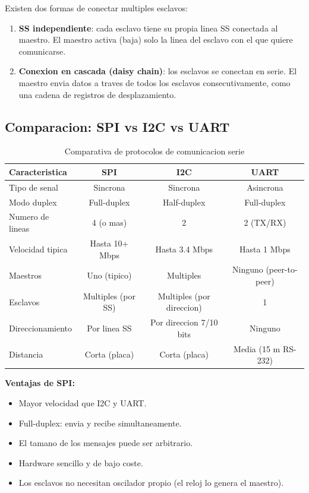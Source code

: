 Existen dos formas de conectar multiples esclavos:

\begin{enumerate}
    \item \textbf{SS independiente}: cada esclavo tiene su propia linea SS
    conectada al maestro. El maestro activa (baja) solo la linea del esclavo
    con el que quiere comunicarse.
    \item \textbf{Conexion en cascada (daisy chain)}: los esclavos se conectan
    en serie. El maestro envia datos a traves de todos los esclavos
    consecutivamente, como una cadena de registros de desplazamiento.
\end{enumerate}

\subsection{Comparacion: SPI vs I2C vs UART}

\begin{table}[H]
    \centering
    \caption{Comparativa de protocolos de comunicacion serie}
    \label{tab:comparativa_spi_i2c_uart}
    \small
    \begin{tabular}{|l|c|c|c|}
        \hline
        \textbf{Caracteristica} & \textbf{SPI} & \textbf{I2C} & \textbf{UART} \\
        \hline
        Tipo de senal & Sincrona & Sincrona & Asincrona \\
        \hline
        Modo duplex & Full-duplex & Half-duplex & Full-duplex \\
        \hline
        Numero de lineas & 4 (o mas) & 2 & 2 (TX/RX) \\
        \hline
        Velocidad tipica & Hasta 10+ Mbps & Hasta 3.4 Mbps & Hasta 1 Mbps \\
        \hline
        Maestros & Uno (tipico) & Multiples & Ninguno (peer-to-peer) \\
        \hline
        Esclavos & Multiples (por SS) & Multiples (por direccion) & 1 \\
        \hline
        Direccionamiento & Por linea SS & Por direccion 7/10 bits & Ninguno \\
        \hline
        Distancia & Corta (placa) & Corta (placa) & Media (15 m RS-232) \\
        \hline
    \end{tabular}
\end{table}

\textbf{Ventajas de SPI:}
\begin{itemize}
    \item Mayor velocidad que I2C y UART.
    \item Full-duplex: envia y recibe simultaneamente.
    \item El tamano de los mensajes puede ser arbitrario.
    \item Hardware sencillo y de bajo coste.
    \item Los esclavos no necesitan oscilador propio (el reloj lo genera el maestro).
\end{itemize}

